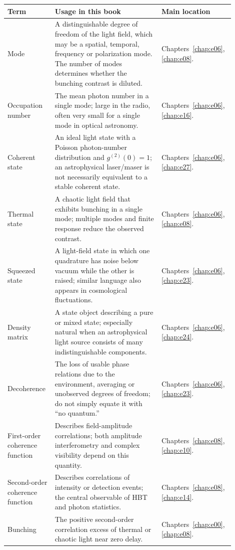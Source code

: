 \begin{longtable}{p{0.20\linewidth}p{0.45\linewidth}p{0.25\linewidth}}
\toprule
Term & Usage in this book & Main location \\
\midrule
Mode & A distinguishable degree of freedom of the light field, which may be a spatial, temporal, frequency or polarization mode. The number of modes determines whether the bunching contrast is diluted. & Chapters~\ref{chap:e06}, \ref{chap:e08}. \\
Occupation number & The mean photon number in a single mode; large in the radio, often very small for a single mode in optical astronomy. & Chapters~\ref{chap:e06}, \ref{chap:e16}. \\
Coherent state & An ideal light state with a Poisson photon-number distribution and \(g^{(2)}(0)=1\); an astrophysical laser/maser is not necessarily equivalent to a stable coherent state. & Chapters~\ref{chap:e06}, \ref{chap:e27}. \\
Thermal state & A chaotic light field that exhibits bunching in a single mode; multiple modes and finite response reduce the observed contrast. & Chapters~\ref{chap:e06}, \ref{chap:e08}. \\
Squeezed state & A light-field state in which one quadrature has noise below vacuum while the other is raised; similar language also appears in cosmological fluctuations. & Chapters~\ref{chap:e06}, \ref{chap:e23}. \\
Density matrix & A state object describing a pure or mixed state; especially natural when an astrophysical light source consists of many indistinguishable components. & Chapters~\ref{chap:e06}, \ref{chap:e24}. \\
Decoherence & The loss of usable phase relations due to the environment, averaging or unobserved degrees of freedom; do not simply equate it with ``no quantum.'' & Chapters~\ref{chap:e06}, \ref{chap:e23}. \\
First-order coherence function & Describes field-amplitude correlations; both amplitude interferometry and complex visibility depend on this quantity. & Chapters~\ref{chap:e08}, \ref{chap:e10}. \\
Second-order coherence function & Describes correlations of intensity or detection events; the central observable of HBT and photon statistics. & Chapters~\ref{chap:e08}, \ref{chap:e14}. \\
Bunching & The positive second-order correlation excess of thermal or chaotic light near zero delay. & Chapters~\ref{chap:e00}, \ref{chap:e08}. \\

\end{longtable}
